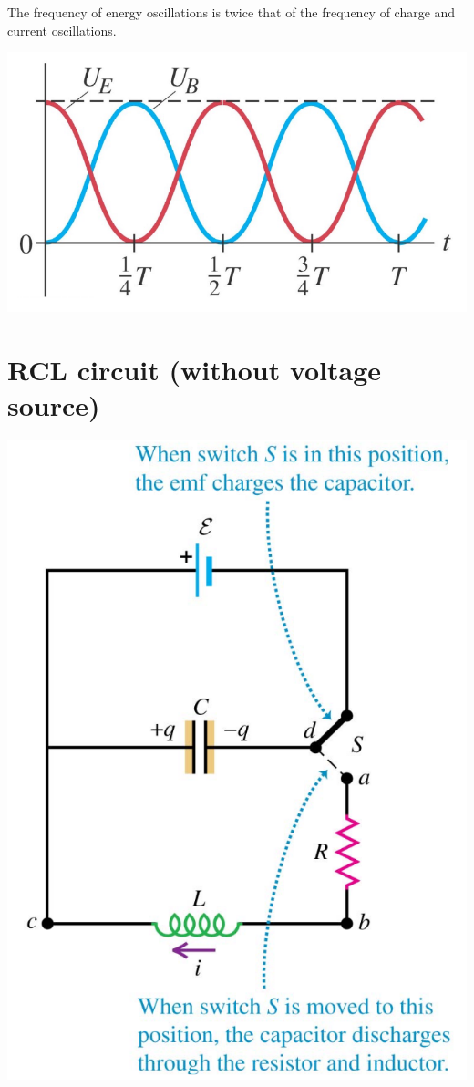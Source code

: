 \documentclass[11pt]{article}
\begin{document}
The frequency of energy oscillations is twice that of the frequency of charge and current oscillations.

\begin{center}
\includegraphics[scale=0.6]{./images/lc-circuit-energy.png}
\end{center}


\section{RCL circuit (without voltage source)}
\label{sec:orgb82d42f}

\begin{center}
\includegraphics[scale=0.52]{./images/rcl-circuit.png}
\end{center}
\end{document}
